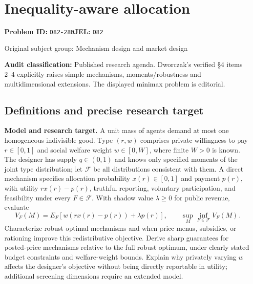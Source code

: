 \documentclass[11pt,a4paper]{article}
\begin{document}
\section*{Inequality-aware allocation}
\textbf{Problem ID:} \texttt{D82-280}\quad \textbf{JEL:} \texttt{D82}\par
\label{problem:OP-0296}
{\sffamily\small\color{muted}Original subject group: Mechanism design and market design\par}
\label{definitions:problem:30007578}
\textbf{Audit classification:} Published research agenda. Dworczak’s verified §4 items 2–4 explicitly raises simple mechanisms, moments/robustness and multidimensional extensions. The displayed minimax problem is editorial.
\subsection*{Definitions and precise research target}
\textbf{Model and research target.} A unit mass of agents demand at most one homogeneous indivisible good. Type \((r,w)\) comprises private willingness to pay \(r\in[0,1]\) and social welfare weight \(w\in[0,W]\), where finite \(W>0\) is known. The designer has supply \(q\in(0,1)\) and knows only specified moments of the joint type distribution; let \(\mathcal F\) be all distributions consistent with them. A direct mechanism specifies allocation probability \(x(r)\in[0,1]\) and payment \(p(r)\), with utility \(r x(r)-p(r)\), truthful reporting, voluntary participation, and feasibility under every \(F\in\mathcal F\). With shadow value \(\lambda\geq0\) for public revenue, evaluate
\[
 V_F(M)=E_F[w(r x(r)-p(r))+\lambda p(r)],\qquad
 \sup_M\inf_{F\in\mathcal F}V_F(M).
\]
Characterize robust optimal mechanisms and when price menus, subsidies, or rationing improve this redistributive objective. Derive sharp guarantees for posted-price mechanisms relative to the full robust optimum, under clearly stated budget constraints and welfare-weight bounds. Explain why privately varying \(w\) affects the designer's objective without being directly reportable in utility; additional screening dimensions require an extended model.
\end{document}
